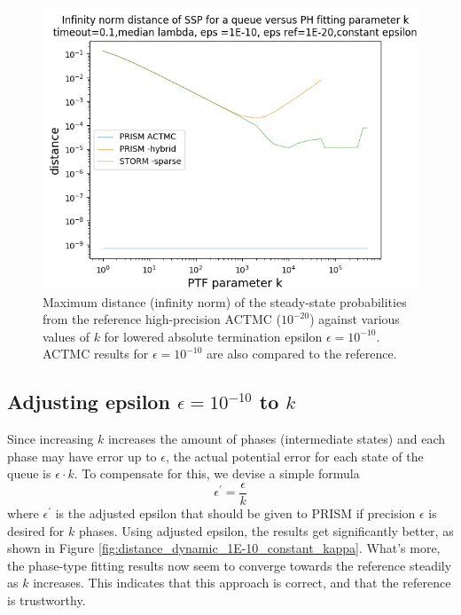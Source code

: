 \documentclass{article}
\numberwithin{equation}{section}		%
\numberwithin{figure}{section}			%
\numberwithin{table}{section}				%
\begin{document}
	
	\begin{figure}[H]
		\begin{center}
			\includegraphics[trim=0.2cm 0cm 0cm 1.35cm,width=15cm, clip]{picture/New_model/1E-10/distance_constant_1E-10.png}
		\end{center}
		\caption{Maximum distance (infinity norm) of the steady-state probabilities from the reference high-precision ACTMC ($10^{-20}$) against various values of $k$ for lowered absolute termination epsilon $\epsilon = 10^{-10}$. ACTMC results for $\epsilon = 10^{-10}$ are also compared to the reference.}
		\label{fig:distance_constant_1E-10_constant_kappa}
	\end{figure}
	
	\subsection{Adjusting epsilon $\epsilon = 10^{-10}$ to $k$}
	\label{adjusting}
	
	Since increasing $k$ increases the amount of phases (intermediate states) and each phase may have error up to $\epsilon$, the actual potential error for each state of the queue is $\epsilon \cdot k$. To compensate for this, we devise a simple formula
	$$\epsilon^{'} = \frac{\epsilon}{k}$$
	where $\epsilon^{'}$ is the adjusted epsilon that should be given to PRISM if precision $\epsilon$ is desired for $k$ phases.
	Using adjusted epsilon, the results get significantly better, as shown in Figure \ref{fig:distance_dynamic_1E-10_constant_kappa}. What's more, the phase-type fitting results now seem to converge towards the reference steadily as $k$ increases. This indicates that this approach is correct, and that the reference is trustworthy.
	
\end{document}

